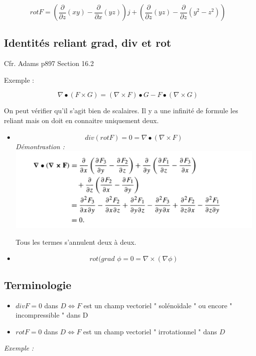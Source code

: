 \[\textit{rot} F = \left( \frac{\partial }{\partial z} (xy) -\frac{\partial }{\partial x} (yz) \right) j
+\left( \frac{\partial }{\partial z} (yz) -\frac{\partial }{\partial z} (y^2-z^2) \right)
 \]



 \subsection{Identités reliant grad, div et rot}

 Cfr. Adams p897 Section 16.2

 Exemple :

 \[\nabla \bullet ( F \times G) = ( \nabla \times F) \bullet G - F \bullet(\nabla \times G ) \]

 On peut vérifier qu'il s'agit bien de scalaires. Il y a une infinité de formule les reliant mais on doit en connaitre uniquement deux.

 \begin{itemize}
 \item
 \[\textit{div}(\textit{rot} F ) = 0 = \nabla \bullet ( \nabla \times F ) \]
\textit{Démontrastion :} \\

 \includegraphics[scale=0.7]{image1.png}

 Tous les termes s'annulent deux à deux.
 \item
 \[\textit{rot} ( \textit{grad }\phi =0 = \nabla \times ( \nabla \phi ) \]

 \end{itemize}
 \subsection{Terminologie}
\begin{itemize}


\item
 $div F = 0$ dans $D \Leftrightarrow F$ est un champ vectoriel " solénoïdale " ou encore " incompressible " dans D

\item $rot F = 0$ dans $D \Leftrightarrow F$ est un champ vectoriel " irrotationnel " dans $D$

\end{itemize}
\textit{ Exemple :} \\

